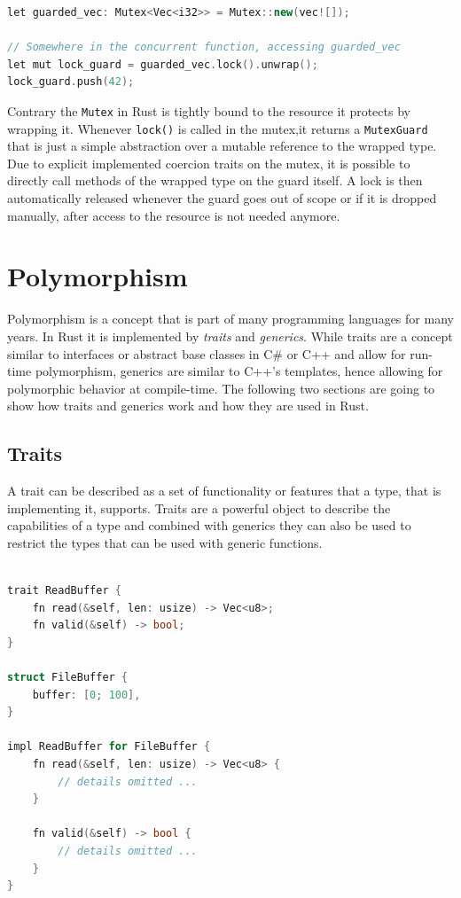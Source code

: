 \begin{lstlisting}[caption={Usage of a std::sync::Mutex to guard a shared resource in Rust}, label={lst:rust_mutex}, language=C++]
let guarded_vec: Mutex<Vec<i32>> = Mutex::new(vec![]);

// Somewhere in the concurrent function, accessing guarded_vec
let mut lock_guard = guarded_vec.lock().unwrap();
lock_guard.push(42);
\end{lstlisting}

\noindent
Contrary the \texttt{Mutex} in Rust is tightly bound to the resource it protects by wrapping it. Whenever \texttt{lock()} is called in the mutex,it returns a \texttt{MutexGuard} that is just a simple abstraction over a mutable reference to the wrapped type. Due to explicit implemented coercion traits on the mutex, it is possible to directly call methods of the wrapped type on the guard itself. A lock is then automatically released whenever the guard goes out of scope or if it is dropped manually, after access to the resource is not needed anymore.

\section{Polymorphism}

Polymorphism is a concept that is part of many programming languages for many years. In Rust it is implemented by \textit{traits} and \textit{generics}. While traits are a concept similar to interfaces or abstract base classes in C\# or C++ and allow for run-time polymorphism, generics are similar to C++'s templates, hence allowing for polymorphic behavior at compile-time. The following two sections are going to show how traits and generics work and how they are used in Rust.

\subsection{Traits}

A trait can be described as a set of functionality or features that a type, that is implementing it, supports. Traits are a powerful object to describe the capabilities of a type and combined with generics they can also be used to restrict the types that can be used with generic functions.\\

\begin{lstlisting}[caption={Example usage of a trait and a type implementing it}, label={lst:rust_trait}, language=C++]

trait ReadBuffer {
	fn read(&self, len: usize) -> Vec<u8>;
	fn valid(&self) -> bool; 
}

struct FileBuffer {
	buffer: [0; 100],
}

impl ReadBuffer for FileBuffer {
	fn read(&self, len: usize) -> Vec<u8> {
		// details omitted ...
	}
	
	fn valid(&self) -> bool {
		// details omitted ...
	}
}
\end{lstlisting}


